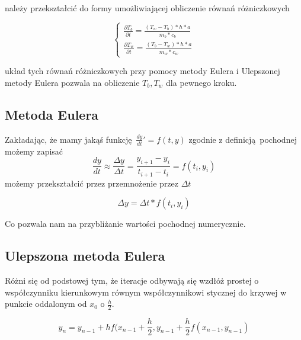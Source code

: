 \documentclass[varwidth,12pt,a4paper]{article}
\begin{document}
należy przekształcić do formy umożliwiającej obliczenie równań różniczkowych

\begin{equation}
     \begin{cases}
    \frac{\partial T_b}{\partial t}=\frac{(T_w-T_b)*h*a}{m_b*c_b} \\
    \frac{\partial T_w}{\partial t}=\frac{(T_b-T_w)*h*a}{m_w*c_w} 
    \end{cases}
\end{equation}

układ tych równań różniczkowych przy pomocy metody Eulera i Ulepszonej metody Eulera pozwala na obliczenie $T_b, T_w$ dla pewnego kroku.



\subsection{Metoda Eulera}

Zakładając, że mamy jakąś funkcję $\frac{dy}{dt}' = f(t,y)$
zgodnie z definicją pochodnej możemy zapisać
\begin{equation}
   \frac{dy}{dt} \approx \frac{\Delta y}{\Delta t} = \frac{y_{i+1} - y_i}{t_{i+1} - t_i} = f(t_i, y_i)
\end{equation}
możemy przekształcić przez przemnożenie przez $\Delta t$

\begin{equation}
    \Delta y = \Delta t * f(t_i, y_i)
\end{equation}

Co pozwala nam na przybliżanie wartości pochodnej numerycznie.



\subsection{Ulepszona metoda Eulera}

Różni się od podstowej tym, że iteracje odbywają się wzdłóż prostej o współczynniku
kierunkowym równym współczynnikowi stycznej do krzywej w punkcie oddalonym od 
$x_0$ o $\frac{h}{2}$.

\begin{equation}
    y_n = y_{n-1} + hf(x_{n-1} + \frac{h}{2}, y_{n-1} + \frac{h}{2} f(x_{n-1}, y_{n-1})
\end{equation}
\end{document}
